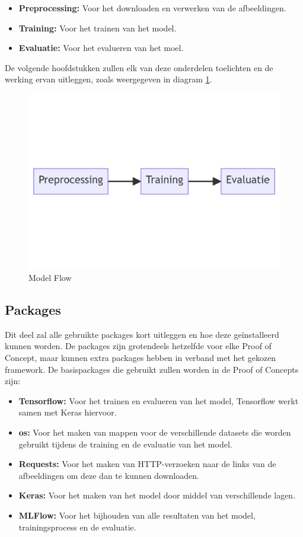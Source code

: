 \begin{itemize}
    \item \textbf{Preprocessing:} Voor het downloaden en verwerken van de afbeeldingen.
    \item \textbf{Training:} Voor het trainen van het model.
    \item \textbf{Evaluatie:} Voor het evalueren van het moel.
\end{itemize}

De volgende hoofdstukken zullen elk van deze onderdelen toelichten en de werking ervan uitleggen, zoals weergegeven in diagram \ref{fig:Model_Flow}.
\begin{figure}[htbp]
    \centering
    \includegraphics[width=0.9\linewidth]{graphics/Model_Diagram.PNG}
    \caption{Model Flow}
    \label{fig:Model_Flow}
\end{figure}
\subsection{Packages}
Dit deel zal alle gebruikte packages kort uitleggen en hoe deze geïnstalleerd kunnen worden. De packages zijn grotendeels hetzelfde voor elke Proof of Concept, maar kunnen extra packages hebben in verband met het gekozen framework.
De basispackages die gebruikt zullen worden in de Proof of Concepts zijn:
\begin{itemize}
    \item \textbf{Tensorflow:} Voor het trainen en evalueren van het model, Tensorflow werkt samen met Keras hiervoor.
    \item \textbf{os:} Voor het maken van mappen voor de verschillende datasets die worden gebruikt tijdens de training en de evaluatie van het model.
    \item \textbf{Requests:} Voor het maken van HTTP-verzoeken naar de links van de afbeeldingen om deze dan te kunnen downloaden.
    \item \textbf{Keras:} Voor het maken van het model door middel van verschillende lagen.
    \item \textbf{MLFlow:} Voor het bijhouden van alle resultaten van het model, trainingsprocess en de evaluatie.
\end{itemize}

